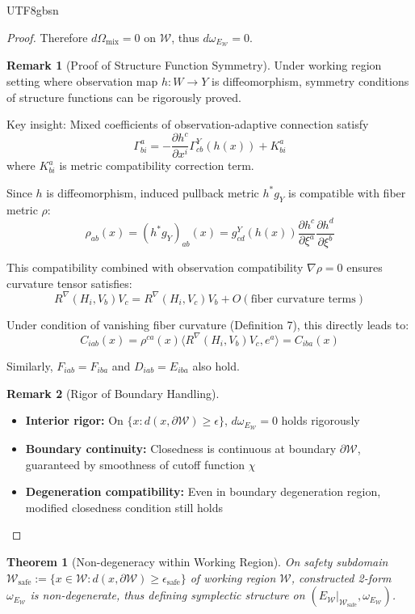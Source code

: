 \documentclass[a4paper,12pt]{extarticle}
\newtheorem{theorem}{Theorem}
\theoremstyle{definition}
\newtheorem{remark}{Remark}
\begin{document}
\begin{CJK}{UTF8}{gbsn}
\begin{proof}
Therefore $d\Omega_{\text{mix}} = 0$ on $\mathcal{W}$, thus $d\omega_{E_{\mathcal{W}}} = 0$.


\begin{remark}[Proof of Structure Function Symmetry]
Under working region setting where observation map $h: W \to Y$ is diffeomorphism, symmetry conditions of structure functions can be rigorously proved.

Key insight: Mixed coefficients of observation-adaptive connection satisfy
$$\Gamma^a_{bi} = -\frac{\partial h^c}{\partial x^i}\Gamma^Y_{cb}(h(x)) + K^a_{bi}$$
where $K^a_{bi}$ is metric compatibility correction term.

Since $h$ is diffeomorphism, induced pullback metric $h^*g_Y$ is compatible with fiber metric $\rho$:
$$\rho_{ab}(x) = (h^*g_Y)_{ab}(x) = g^Y_{cd}(h(x))\frac{\partial h^c}{\partial \xi^a}\frac{\partial h^d}{\partial \xi^b}$$

This compatibility combined with observation compatibility $\nabla \rho = 0$ ensures curvature tensor satisfies:
$$R^\nabla(H_i, V_b)V_c = R^\nabla(H_i, V_c)V_b + O(\text{fiber curvature terms})$$

Under condition of vanishing fiber curvature (Definition 7), this directly leads to:
$$C_{iab}(x) = \rho^{ca}(x)\langle R^\nabla(H_i, V_b)V_c, e^a\rangle = C_{iba}(x)$$

Similarly, $F_{iab} = F_{iba}$ and $D_{iab} = E_{iba}$ also hold.
\end{remark}

\begin{remark}[Rigor of Boundary Handling]
\begin{itemize}
\item \textbf{Interior rigor:} On $\{x : d(x,\partial \mathcal{W}) \geq \epsilon\}$, $d\omega_{E_{\mathcal{W}}} = 0$ holds rigorously
\item \textbf{Boundary continuity:} Closedness is continuous at boundary $\partial \mathcal{W}$, guaranteed by smoothness of cutoff function $\chi$
\item \textbf{Degeneration compatibility:} Even in boundary degeneration region, modified closedness condition still holds
\end{itemize}
\end{remark}
\end{proof}

\begin{theorem}[Non-degeneracy within Working Region]
On safety subdomain $\mathcal{W}_{\text{safe}} := \{x \in \mathcal{W} : d(x,\partial \mathcal{W}) \geq \epsilon_{\text{safe}}\}$ of working region $\mathcal{W}$, constructed 2-form $\omega_{E_{\mathcal{W}}}$ is non-degenerate, thus defining symplectic structure on $(E_{\mathcal{W}}|_{\mathcal{W}_{\text{safe}}}, \omega_{E_{\mathcal{W}}})$.
\end{theorem}


\end{CJK}
\end{document}
